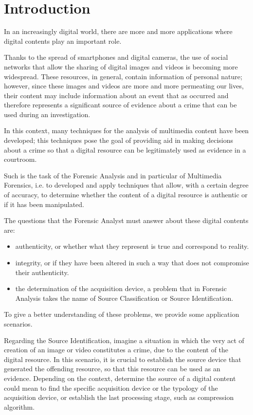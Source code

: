 \chapter*{Introduction}

In an increasingly digital world, there are more and more applications where digital contents play an important role.

Thanks to the spread of smartphones and digital cameras, the use of social networks that allow the sharing of digital images and videos is becoming more widespread. These resources, in general, contain information of personal nature; however, since these images and videos are more and more permeating our lives, their content may include information about an event that as occurred and therefore represents a significant source of evidence about a crime that can be used during an investigation.

In this context, many techniques for the analysis of multimedia content have been developed; this techniques pose the goal of providing aid in making decisions about a crime so that a digital resource can be legitimately used as evidence in a courtroom.

Such is the task of the Forensic Analysis and in particular of Multimedia Forensics, i.e. to developed and apply techniques that allow, with a certain degree of accuracy, to determine whether the content of a digital resource is authentic or if it has been manipulated.

The questions that the Forensic Analyst must answer about these digital contents are:
\begin{itemize}
\item authenticity, or whether what they represent is true and correspond to reality.
\item integrity, or if they have been altered in such a way that does not compromise their authenticity.
\item the determination of the acquisition device, a problem that in Forensic Analysis takes the name of Source Classification or Source Identification.
\end{itemize}

To give a better understanding of these problems, we provide some application scenarios.

Regarding the Source Identification, imagine a situation in which the very act of creation of an image or video constitutes a crime, due to the content of the digital resource. In this scenario, it is crucial to establish the source device that generated the offending resource, so that this resource can be used as an evidence. Depending on the context, determine the source of a digital content could mean to find the specific acquisition device or the typology of the acquisition device, or establish the last processing stage, such as compression algorithm.

